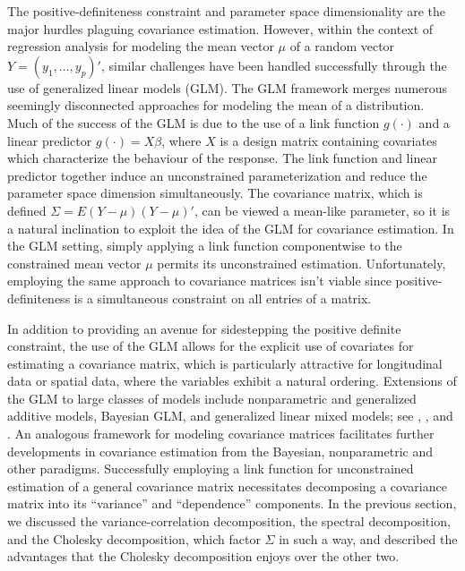 The positive-definiteness constraint and parameter space dimensionality are the major hurdles plaguing covariance estimation. However, within the context of regression analysis for modeling the mean vector $\mu$ of a random vector $Y = \left(y_1, \dots , y_p\right)'$, similar challenges have been handled successfully through the use of generalized linear models (GLM). The GLM framework \cite{McCullagh1989} merges numerous seemingly disconnected approaches for modeling the mean of a distribution. Much of the success of the GLM is due to the use of a link function $g\left(\cdot\right)$ and a linear predictor $g\left(\cdot\right) = X\beta$, where $X$ is a design matrix containing covariates which characterize the behaviour of the response. The link function and linear predictor together induce an unconstrained parameterization and reduce the parameter space dimension simultaneously.  The covariance matrix, which is defined $\Sigma = E\left(Y - \mu\right)\left(Y - \mu\right)'$, can be viewed a mean-like parameter, so it is a natural inclination to exploit the idea of the GLM for covariance estimation. In the GLM setting, simply applying a link function componentwise to the constrained mean vector $\mu$ permits its unconstrained estimation. Unfortunately, employing the same approach to covariance matrices isn't viable since positive-definiteness is a simultaneous constraint on all entries of a matrix. 

\bigskip

In addition to providing an avenue for sidestepping the positive definite constraint, the use of the GLM allows for the explicit use of covariates for estimating a covariance matrix, which is particularly attractive for longitudinal data or spatial data, where the variables exhibit a natural ordering. Extensions of the GLM to large classes of models include nonparametric and generalized additive models, Bayesian GLM, and generalized linear mixed models; see \cite{hastie1990generalized},  \cite{dey2000generalized}, and \cite{mcculloch2001generalized}. An analogous framework for modeling covariance matrices facilitates further developments in covariance estimation from the Bayesian, nonparametric and other paradigms. Successfully employing a link function for unconstrained estimation of a general covariance matrix necessitates decomposing a covariance matrix into its ``variance'' and ``dependence'' components. In the previous section, we discussed  the variance-correlation decomposition, the spectral decomposition, and the Cholesky decomposition, which factor $\Sigma$ in such a way, and described the advantages that the Cholesky decomposition enjoys over the other two.  

